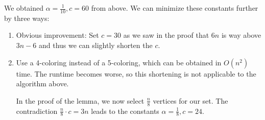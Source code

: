 \documentclass[10pt]{article}
\theoremstyle{definition}
\newtheorem{lemma}{Lemma}
\theoremstyle{remark}
\begin{document}
We obtained \(\alpha = \frac{1}{10}, c = 60\) from above. We can minimize these constants further by three ways:

\begin{enumerate}
    \item Obvious improvement: Set \(c = 30\) as we saw in the proof that \(6n\) is way above \(3n-6\) and thus we can slightly shorten the \(c\).
    \item Use a 4-coloring instead of a 5-coloring, which can be obtained in \(O(n^2)\) time. The runtime becomes worse, so this shortening is not applicable to the algorithm above.

    In the proof of the lemma, we now select \(\frac{n}{8}\) vertices for our set. The contradiction \(\frac{n}{8} \cdot c = 3n\) leads to the constants \(\alpha = \frac{1}{8}, c = 24\).
\end{enumerate}
\end{document}
